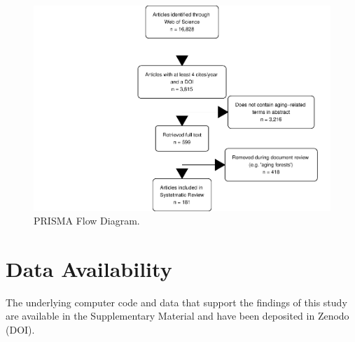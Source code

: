 \documentclass[12pt]{article}
\begin{document}
\begin{figure}
\centering
\includegraphics{MainDocument_files/figure-latex/figureflowdiagram-1.pdf}
\caption{PRISMA Flow Diagram. \label{fig-diagram}}
\end{figure}

\hypertarget{data-availability}{%
\section{Data Availability}\label{data-availability}}

The underlying computer code and data that support the findings of this
study are available in the Supplementary Material and have been
deposited in Zenodo (DOI).



\end{document}
